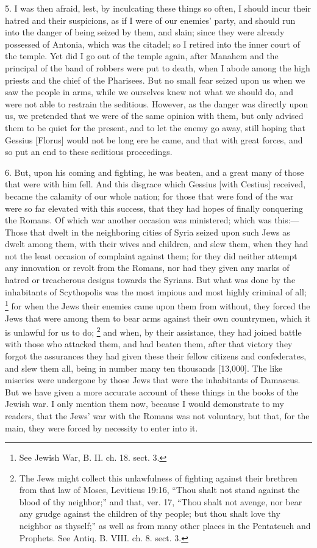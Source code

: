 5. I was then afraid, lest, by inculcating these things so often, I should
incur their hatred and their suspicions, as if I were of our enemies'
party, and should run into the danger of being seized by them, and slain;
since they were already possessed of Antonia, which was the citadel; so I
retired into the inner court of the temple. Yet did I go out of the temple
again, after Manahem and the principal of the band of robbers were put to
death, when I abode among the high priests and the chief of the Pharisees.
But no small fear seized upon us when we saw the people in arms, while we
ourselves knew not what we should do, and were not able to restrain the
seditious. However, as the danger was directly upon us, we pretended that
we were of the same opinion with them, but only advised them to be quiet
for the present, and to let the enemy go away, still hoping that Gessius
[Florus] would not be long ere he came, and that with great forces, and so
put an end to these seditious proceedings.

6. But, upon his coming and fighting, he was beaten, and a great many of
those that were with him fell. And this disgrace which Gessius [with
Cestius] received, became the calamity of our whole nation; for those that
were fond of the war were so far elevated with this success, that they had
hopes of finally conquering the Romans. Of which war another occasion was
ministered; which was this:— Those that dwelt in the neighboring
cities of Syria seized upon such Jews as dwelt among them, with their
wives and children, and slew them, when they had not the least occasion of
complaint against them; for they did neither attempt any innovation or
revolt from the Romans, nor had they given any marks of hatred or
treacherous designs towards the Syrians. But what was done by the
inhabitants of Scythopolis was the most impious and most highly criminal
of all; \footnote{See Jewish War, B. II. ch.
18. sect. 3.}
for when the Jews their enemies came upon them from without, they forced
the Jews that were among them to bear arms against their own countrymen,
which it is unlawful for us to do; \footnote{The Jews might collect this
unlawfulness of fighting against their brethren from that law of Moses,
Leviticus 19:16, ``Thou shalt not stand against the blood of thy neighbor;''
and that, ver. 17, ``Thou shalt not avenge, nor bear any grudge against the
children of thy people; but thou shalt love thy neighbor as thyself;'' as
well as from many other places in the Pentateuch and Prophets. See Antiq.
B. VIII. ch. 8. sect. 3.} and when, by
their assistance, they had joined battle with those who attacked them, and
had beaten them, after that victory they forgot the assurances they had
given these their fellow citizens and confederates, and slew them all,
being in number many ten thousands [13,000]. The like miseries were
undergone by those Jews that were the inhabitants of Damascus. But we have
given a more accurate account of these things in the books of the Jewish
war. I only mention them now, because I would demonstrate to my readers,
that the Jews' war with the Romans was not voluntary, but that, for the
main, they were forced by necessity to enter into it.


